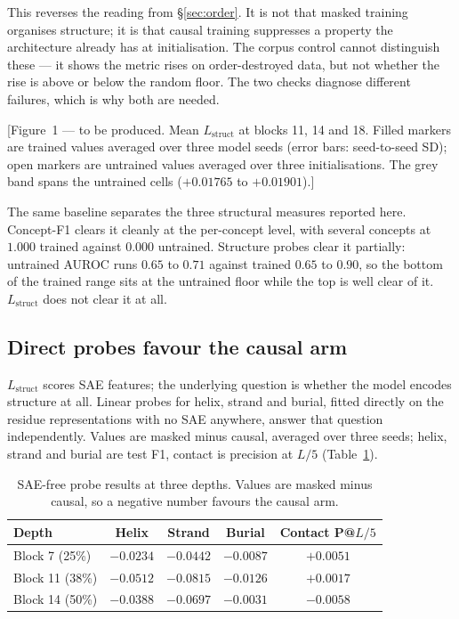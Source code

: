 \documentclass{article} %
\newcommand{\red}[1]{\textcolor{red}{#1}}
\newcommand{\opentag}[1]{\textcolor{red}{\textsuperscript{[\ref{#1}]}}}
\renewcommand{\red}[1]{#1}
\renewcommand{\opentag}[1]{}
\newcommand{\Lstruct}{\ensuremath{L_{\mathrm{struct}}}}
\begin{document}
This reverses the reading from \S\ref{sec:order}. It is not that masked training organises
structure; it is that causal training suppresses a property the architecture already has at
initialisation. The corpus control cannot distinguish these --- it shows the metric rises on
order-destroyed data, but not whether the rise is above or below the random floor. The two checks
diagnose different failures, which is why both are needed.

\red{[Figure~1 --- to be produced. Mean \Lstruct{} at blocks 11, 14 and 18. Filled markers are
trained values averaged over three model seeds (error bars: seed-to-seed SD); open markers are
untrained values averaged over three initialisations. The grey band spans the untrained cells
($+0.01765$ to $+0.01901$).]}\opentag{fig:one}

The same baseline separates the three structural measures reported here. Concept-F1 clears it
cleanly at the per-concept level, with several concepts at $1.000$ trained against $0.000$
untrained. Structure probes clear it partially: untrained AUROC runs $0.65$ to $0.71$ against
trained $0.65$ to $0.90$, so the bottom of the trained range sits at the untrained floor while the
top is well clear of it. \Lstruct{} does not clear it at all.

\subsection{Direct probes favour the causal arm}
\label{sec:probes}

\Lstruct{} scores SAE features; the underlying question is whether the model encodes structure at
all. Linear probes for helix, strand and burial, fitted directly on the residue representations
with no SAE anywhere, answer that question independently. Values are masked minus causal, averaged
over three seeds; helix, strand and burial are test F1, contact is precision at $L/5$
(Table~\ref{tab:probes}).

\begin{table}[t]
\caption{SAE-free probe results at three depths. Values are masked minus causal, so a negative
number favours the causal arm.}
\label{tab:probes}
\begin{center}
\begin{tabular}{lcccc}
\toprule
Depth & Helix & Strand & Burial & Contact P@$L/5$ \\
\midrule
Block 7 (25\%)  & $-0.0234$ & $-0.0442$ & $-0.0087$ & $+0.0051$ \\
Block 11 (38\%) & $-0.0512$ & $-0.0815$ & $-0.0126$ & $+0.0017$ \\
Block 14 (50\%) & $-0.0388$ & $-0.0697$ & $-0.0031$ & $-0.0058$ \\
\bottomrule
\end{tabular}
\end{center}
\end{table}
\end{document}
